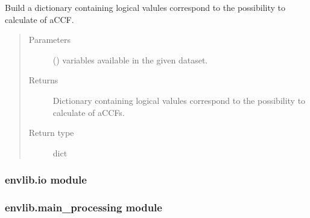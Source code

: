 \documentclass[a4paper,11pt,english]{sphinxmanual}
\begin{document}

\begin{fulllineitems}
\label{\detokenize{envlib:envlib.extract_data.logic_cal_accfs}}
\sphinxAtStartPar
Build a dictionary containing logical valules correspond to the possibility to calculate of aCCF.
\begin{quote}\begin{description}
\item[{Parameters}] \leavevmode
\sphinxAtStartPar
{} () \textendash{} variables available in the given dataset.

\item[{Returns}] \leavevmode
\sphinxAtStartPar
Dictionary containing logical valules correspond to the possibility to calculate of aCCFs.

\item[{Return type}] \leavevmode
\sphinxAtStartPar
dict

\end{description}\end{quote}

\end{fulllineitems}



\subsubsection{envlib.io module}
\label{\detokenize{envlib:module-envlib.io}}\label{\detokenize{envlib:envlib-io-module}}

\subsubsection{envlib.main\_processing module}
\label{\detokenize{envlib:module-envlib.main_processing}}\label{\detokenize{envlib:envlib-main-processing-module}}
\end{document}
